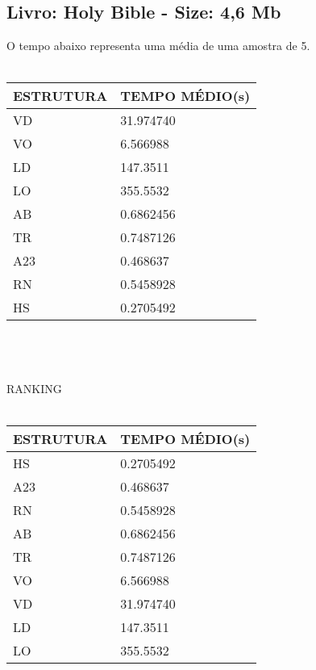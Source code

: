 \documentclass[14pt]{article}
\begin{document}
{\subsection{Livro: Holy Bible - Size: 4,6 Mb    }
O tempo abaixo representa uma média de uma amostra de 5.\\\\
\begin{tabular}{ |p{3.1cm}||p{4.1cm}|}
    \hline
    ESTRUTURA & TEMPO MÉDIO(s)\\
    \hline
    VD & 31.974740 \\
    VO & 6.566988 \\
    LD & 147.3511 \\
    LO & 355.5532 \\
    AB & 0.6862456 \\
    TR & 0.7487126 \\
    A23 & 0.468637 \\
    RN &  0.5458928 \\
    HS &  0.2705492 \\
    \hline
\end{tabular}\\\\\\
RANKING \\\\
\begin{tabular}{ |p{3.1cm}||p{4.1cm}|}
    \hline
    ESTRUTURA & TEMPO MÉDIO(s)\\
    \hline
    HS &  0.2705492 \\
    A23 & 0.468637 \\
    RN &  0.5458928 \\
    AB & 0.6862456 \\
    TR & 0.7487126 \\
    VO & 6.566988 \\    
    VD & 31.974740 \\
    LD & 147.3511 \\
    LO & 355.5532 \\
    \hline
\end{tabular}\\\\

}
\end{document}
